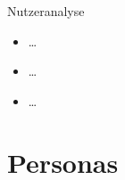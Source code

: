 \documentclass[presentation,bigger,aspectratio=169]{beamer}
\begin{document}
\begin{frame}[label={sec:orgec09c42}]{Nutzeranalyse}
\begin{itemize}
\item \ldots{}
\item \ldots{}
\item \ldots{}
\end{itemize}
\end{frame}
\section{Personas}
\label{sec:org0eef32a}
\begin{frame}[label={sec:org5863da5}]{\vspace{2.2cm}\begin{center}\MakeUppercase{\insertsection}\end{center}}
\end{frame}
\end{document}
